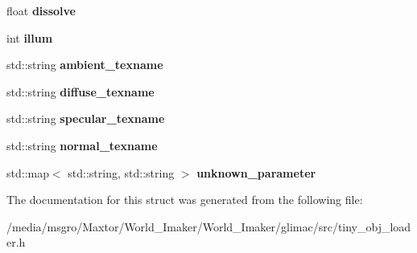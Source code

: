 \begin{DoxyCompactItemize}
float {\bfseries dissolve}
\item 
\mbox{\label{structtinyobj_1_1material__t_af846245315bd70c1a4f815dfdd6b80cc}} 
int {\bfseries illum}
\item 
\mbox{\label{structtinyobj_1_1material__t_ae988eed637f368374becbb672798a45e}} 
std\+::string {\bfseries ambient\+\_\+texname}
\item 
\mbox{\label{structtinyobj_1_1material__t_ad7f71a301a261fca07d2e50edccc792d}} 
std\+::string {\bfseries diffuse\+\_\+texname}
\item 
\mbox{\label{structtinyobj_1_1material__t_aed8c38d64472ba0db5186dba800b1b34}} 
std\+::string {\bfseries specular\+\_\+texname}
\item 
\mbox{\label{structtinyobj_1_1material__t_a7512ccf46044357bea1739d583871578}} 
std\+::string {\bfseries normal\+\_\+texname}
\item 
\mbox{\label{structtinyobj_1_1material__t_a18b700227c94d410ed1aa550c7fa9226}} 
std\+::map$<$ std\+::string, std\+::string $>$ {\bfseries unknown\+\_\+parameter}
\end{DoxyCompactItemize}


The documentation for this struct was generated from the following file\+:\begin{DoxyCompactItemize}
\item 
/media/msgro/\+Maxtor/\+World\+\_\+\+Imaker/\+World\+\_\+\+Imaker/glimac/src/tiny\+\_\+obj\+\_\+loader.\+h\end{DoxyCompactItemize}
